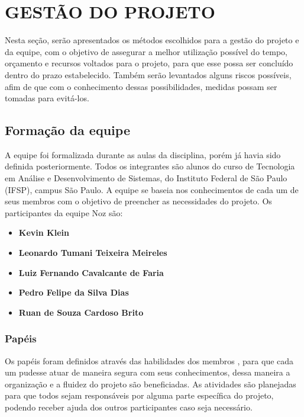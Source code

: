 \chapter{GESTÃO DO PROJETO}
Nesta seção, serão apresentados os métodos escolhidos para a gestão do projeto e da equipe, com o objetivo de assegurar a melhor utilização possível do tempo, orçamento e recursos voltados para o projeto, para que esse possa ser concluído dentro do prazo estabelecido. Também serão levantados alguns riscos possíveis, afim de que com o conhecimento dessas possibilidades, medidas possam ser tomadas para evitá-los.  

\section{Formação da equipe}
A equipe foi formalizada durante as aulas da disciplina, porém já havia sido definida posteriormente. Todos os integrantes são alunos do curso de Tecnologia em Análise e Desenvolvimento de Sistemas, do Instituto Federal de São Paulo (IFSP), campus São Paulo. A equipe se baseia nos conhecimentos de cada um de seus membros com o objetivo de preencher as necessidades do projeto. Os participantes da equipe Noz são: 

\begin{itemize}
    \item \textbf{Kevin Klein}
    \item \textbf{Leonardo Tumani Teixeira Meireles}
    \item \textbf{Luiz Fernando Cavalcante de Faria}
    \item \textbf{Pedro Felipe da Silva Dias}
    \item \textbf{Ruan de Souza Cardoso Brito}
\end{itemize}

\subsection{Papéis}
Os papéis foram definidos através das habilidades dos membros , para que cada um pudesse atuar de maneira segura com seus conhecimentos, dessa maneira a organização e a fluidez do projeto são beneficiadas. As atividades são planejadas para que todos sejam responsáveis por alguma parte específica do projeto, podendo receber ajuda dos outros participantes caso seja necessário.

\newpage
